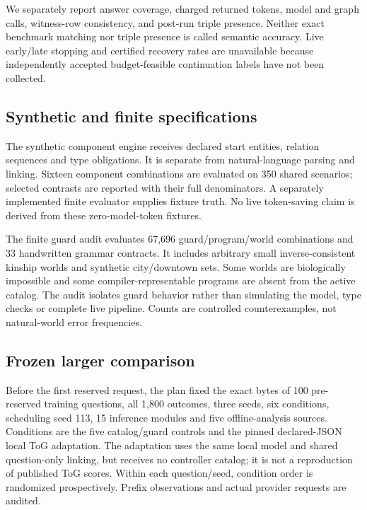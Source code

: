 \documentclass[10pt]{article}
\begin{document}
We separately report answer coverage, charged returned tokens, model and graph calls, witness-row consistency, and post-run triple presence. Neither exact benchmark matching nor triple presence is called semantic accuracy. Live early/late stopping and certified recovery rates are unavailable because independently accepted budget-feasible continuation labels have not been collected.\par

\subsection{Synthetic and finite specifications}

The synthetic component engine receives declared start entities, relation sequences and type obligations. It is separate from natural-language parsing and linking. Sixteen component combinations are evaluated on 350 shared scenarios; selected contrasts are reported with their full denominators. A separately implemented finite evaluator supplies fixture truth. No live token-saving claim is derived from these zero-model-token fixtures.\par

The finite guard audit evaluates 67,696 guard/program/world combinations and 33 handwritten grammar contracts. It includes arbitrary small inverse-consistent kinship worlds and synthetic city/downtown sets. Some worlds are biologically impossible and some compiler-representable programs are absent from the active catalog. The audit isolates guard behavior rather than simulating the model, type checks or complete live pipeline. Counts are controlled counterexamples, not natural-world error frequencies.\par

\subsection{Frozen larger comparison}

Before the first reserved request, the plan fixed the exact bytes of 100 pre-reserved training questions, all 1,800 outcomes, three seeds, six conditions, scheduling seed 113, 15 inference modules and five offline-analysis sources. Conditions are the five catalog/guard controls and the pinned declared-JSON local ToG adaptation. The adaptation uses the same local model and shared question-only linking, but receives no controller catalog; it is not a reproduction of published ToG scores. Within each question/seed, condition order is randomized prospectively. Prefix observations and actual provider requests are audited.\par
\end{document}
